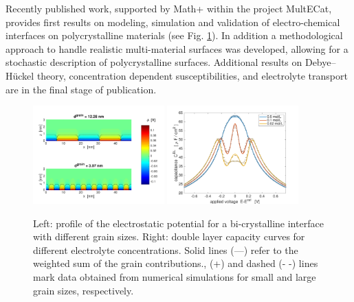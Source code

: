\documentclass[a4paper,10pt]{article}
\begin{document}
Recently published work\cite{JES}, supported by Math+ within the project MultECat, provides first results on modeling, simulation and validation of electro-chemical interfaces on polycrystalline materials (see Fig. \ref{fig:JES}). In addition a methodological approach to handle realistic multi-material surfaces was developed, allowing for a stochastic description of polycrystalline surfaces. Additional results on Debye--Hückel theory, concentration dependent susceptibilities, and electrolyte transport are in the final stage of publication. %

\begin{figure}
  \centering
  \includegraphics[width=0.45\textwidth]{phi_poly2d_gran.pdf}
  \includegraphics[width=0.45\textwidth]{c_2d_grain.pdf}
  \caption{Left: profile of the electrostatic potential for a bi-crystalline interface with different
    grain sizes.
    Right: double layer capacity curves for different electrolyte concentrations.
    Solid lines (—) refer to the weighted sum of the grain contributions.,
    (+) and dashed (- -) lines mark data obtained from numerical simulations for
    small and large grain sizes, respectively.
 \label{fig:JES}}
\end{figure}
\end{document}
